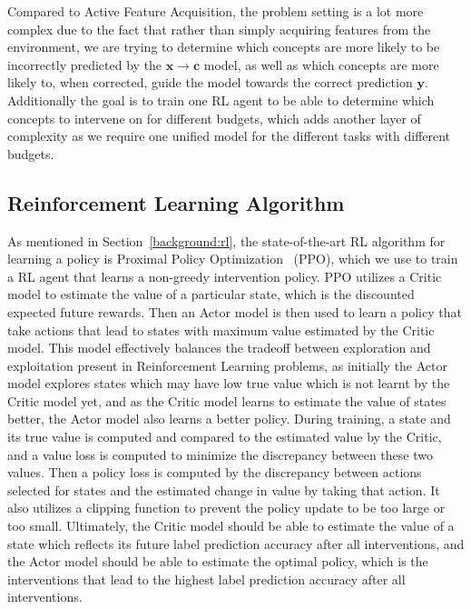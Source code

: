 Compared to Active Feature Acquisition, the problem setting is a lot more complex due to the fact that
rather than simply acquiring features from the environment, we are trying to determine
which concepts are more likely to be incorrectly predicted by the $\mathbf{x} \to \mathbf{c}$ model, 
as well as 
which concepts are more likely to, when corrected, guide the model towards the correct prediction
 $\mathbf{y}$.
Additionally the goal is to train one RL agent to be able to determine which concepts
to intervene on for different budgets, which adds another layer of complexity as we require
one unified model for the different tasks with different budgets.

\subsection{Reinforcement Learning Algorithm}

As mentioned in Section~\ref{background:rl}, the state-of-the-art RL algorithm 
for learning
a policy is Proximal Policy Optimization~\cite{ppo} (PPO), which we use
to train a RL agent that learns a non-greedy intervention policy.
PPO utilizes a Critic model to estimate
the value of a particular state, which is the discounted expected future rewards. Then
an Actor model is then used to learn a policy
that take actions that lead to states with maximum value estimated by the
Critic model.
This model effectively balances the tradeoff between exploration and exploitation
present in Reinforcement Learning problems,
as initially the Actor model explores states which may have low true value
which is not learnt by the Critic model yet, and as the Critic model
learns to estimate the value of states better, the Actor model also 
learns a better policy.
During training, a state and its true value is computed
and compared to the estimated value by the Critic, and a value loss is computed to minimize
the discrepancy between these two values. Then a policy loss is computed
by the discrepancy between actions selected for states and the estimated
change in value by taking that action. It also utilizes
a clipping function to prevent the policy update 
to be too large or too small.
Ultimately, the Critic model
should be able to estimate the value of a state which reflects
its future label prediction accuracy after all interventions,
and the Actor model should be able to estimate the optimal policy, 
which is the interventions that lead to the highest label prediction accuracy 
after all interventions.


